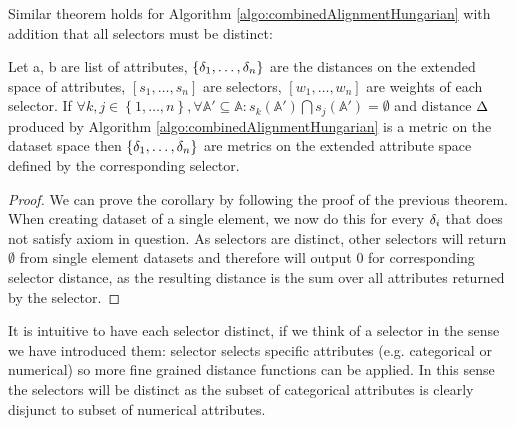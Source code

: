 Similar theorem holds for Algorithm \ref{algo:combinedAlignmentHungarian} with addition that all selectors must be distinct:
\begin{corollary}
		\label{corollary:metricRestoration}
		Let a, b are list of attributes, $\{\delta_1, \dots, \delta_n\}$ are the distances on the extended space of attributes, $[s_1, \dots, s_n]$ are selectors, $[w_1, \dots, w_n]$ are weights of each selector. If $\forall k,j \in \left\{1, \dots, n\right\}, \forall \mathbb{A'} \subseteq \mathbb{A}:s_k(\mathbb{A'})\bigcap s_j(\mathbb{A'})= \emptyset$ and distance $\Delta$ produced by Algorithm \ref{algo:combinedAlignmentHungarian} is a metric on the dataset space then $\{\delta_1, \dots, \delta_n\}$ are metrics on the extended attribute space defined by the corresponding selector.	
	\begin{proof}
		We can prove the corollary by following the proof of the previous theorem. When creating dataset of a single element, we now do this for every $\delta_i$ that does not satisfy axiom in question. As selectors are distinct, other selectors will return $\emptyset$ from single element datasets and therefore will output 0 for corresponding selector distance, as the resulting distance is the sum over all attributes returned by the selector.
	\end{proof}
\end{corollary}
It is intuitive to have each selector distinct, if we think of a selector in the sense we have introduced them: selector selects specific attributes (e.g. categorical or numerical) so more fine grained distance functions can be applied. In this sense the selectors will be distinct as the subset of categorical attributes is clearly disjunct to subset of numerical attributes.

